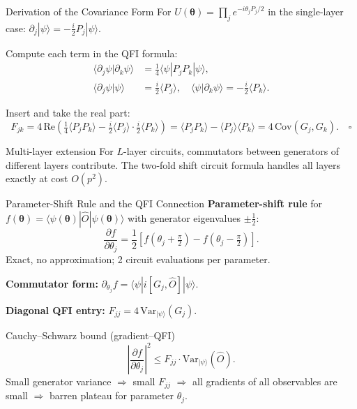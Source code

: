 \documentclass[aspectratio=169,10pt]{beamer}
\newcommand{\btheta}{\boldsymbol{\theta}}
\newcommand{\Variance}{\mathrm{Var}}
\begin{document}
\begin{frame}{Derivation of the Covariance Form}
  For $U(\btheta)=\prod_j e^{-i\theta_j P_j/2}$
  in the single-layer case:
  $\partial_j|\psi\rangle = -\tfrac{i}{2}P_j|\psi\rangle$.

  \medskip
  Compute each term in the QFI formula:
  \begin{align*}
    \langle\partial_j\psi|\partial_k\psi\rangle
    &= \tfrac{1}{4}\langle\psi|P_j P_k|\psi\rangle, \\
    \langle\partial_j\psi|\psi\rangle
    &= \tfrac{i}{2}\langle P_j\rangle, \quad
    \langle\psi|\partial_k\psi\rangle
    = -\tfrac{i}{2}\langle P_k\rangle.
  \end{align*}

  Insert and take the real part:
  \[
    F_{jk}
    = 4\,\mathrm{Re}\!\left(
        \tfrac{1}{4}\langle P_j P_k\rangle
       -\tfrac{i}{2}\langle P_j\rangle\cdot
        \tfrac{i}{2}\langle P_k\rangle
      \right)
    = \langle P_j P_k\rangle
      - \langle P_j\rangle\langle P_k\rangle
    = 4\,\mathrm{Cov}(G_j,G_k). \quad\square
  \]

  \begin{alertblock}{Multi-layer extension}
    For $L$-layer circuits, commutators between generators
    of different layers contribute.
    The two-fold shift circuit formula handles all layers
    exactly at cost $O(p^2)$.
  \end{alertblock}
\end{frame}

\begin{frame}{Parameter-Shift Rule and the QFI Connection}
  \textbf{Parameter-shift rule} for
  $f(\btheta)=\langle\psi(\btheta)|\hat{O}|\psi(\btheta)\rangle$
  with generator eigenvalues $\pm\tfrac12$:
  \[
    \frac{\partial f}{\partial\theta_j}
    = \frac{1}{2}\!\left[
        f\!\left(\theta_j+\tfrac\pi2\right)
       -f\!\left(\theta_j-\tfrac\pi2\right)
      \right].
  \]
  Exact, no approximation; 2 circuit evaluations per parameter.

  \medskip
  \textbf{Commutator form:}
  $\partial_{\theta_j}f
   = \langle\psi|i[G_j,\hat{O}]|\psi\rangle$.

  \medskip
  \textbf{Diagonal QFI entry:}
  $F_{jj} = 4\,\Variance_{|\psi\rangle}(G_j)$.

  \medskip
  \begin{block}{Cauchy--Schwarz bound (gradient--QFI)}
    \[
      \left|\frac{\partial f}{\partial\theta_j}\right|^2
      \leq F_{jj}\cdot\Variance_{|\psi\rangle}(\hat{O}).
    \]
    Small generator variance $\Rightarrow$ small $F_{jj}$
    $\Rightarrow$ all gradients of all observables are small
    $\Rightarrow$ barren plateau for parameter $\theta_j$.
  \end{block}
\end{frame}
\end{document}
